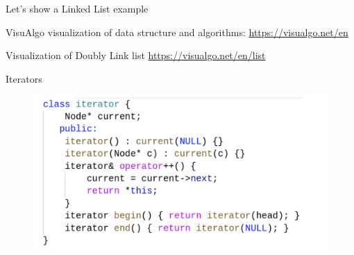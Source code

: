 \documentclass[aspectratio=169]{beamer}
\begin{document}
\begin{frame}{Let's show a Linked List example}
    \begin{block}{VisuAlgo}
         visualization of data structure and algorithms: \url{https://visualgo.net/en}
    \end{block}
    \begin{block}{Visualization of Doubly Link list}
        \url{https://visualgo.net/en/list}
    \end{block}
\end{frame}





\begin{frame}{Iterators}
  \begin{figure}
    \includegraphics[width=\textwidth]{LL_iterator.png}
  \end{figure}
\end{frame}
\end{document}
